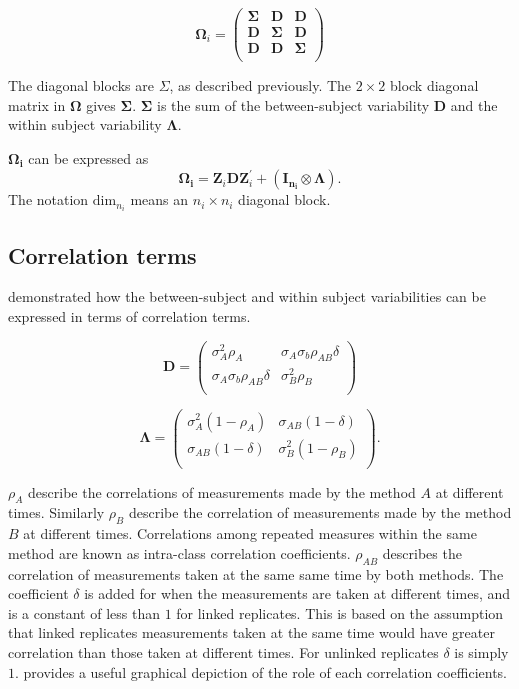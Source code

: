 \documentclass[12pt, a4paper]{report}
\theoremstyle{plain}
\theoremstyle{definition}
\theoremstyle{remark}
\begin{document}
	\[
	\boldsymbol{\Omega}_{i} = \left(
	\begin{array}{ccc}
	\boldsymbol{\Sigma} & \boldsymbol{D} & \boldsymbol{D}\\
	\boldsymbol{D} & \boldsymbol{\Sigma} & \boldsymbol{D}\\
	\boldsymbol{D} & \boldsymbol{D} & \boldsymbol{\Sigma}\\
	\end{array}\right)
	\]
	
	The diagonal blocks are $\Sigma$, as described previously. The $2 \times 2$ block diagonal matrix in $\boldsymbol{\Omega}$ gives $\boldsymbol{\Sigma}$. $\boldsymbol{\Sigma}$ is the sum of the between-subject variability $\boldsymbol{D}$ and the within subject variability $\boldsymbol{\Lambda}$.
	
	$\boldsymbol{\Omega_{i}}$ can be expressed as
	\[
	\boldsymbol{\Omega_{i}} = \boldsymbol{Z}_{i}\boldsymbol{D}\boldsymbol{Z}_{i}^\prime + ({\boldsymbol{I_{n_{i}}} \otimes \boldsymbol{\Lambda}}).
	\]
	The notation $\mbox{dim}_{n_{i}}$ means an $n_{i} \times n_{i}$ diagonal block.
	
	\subsection{Correlation terms}
	\citet{hamlett} demonstrated how the between-subject and within subject variabilities can be expressed in terms of
	correlation terms.
	
	\[
	\boldsymbol{D} = \left( \begin{array}{cc}
	\sigma^2_{A}\rho_{A} & \sigma_{A}\sigma_{b}\rho_{AB}\delta \\
	\sigma_{A}\sigma_{b}\rho_{AB}\delta & \sigma^2_{B}\rho_{B}\\
	
	\end{array}\right)
	\]
	
	\[
	\boldsymbol{\Lambda} = \left(
	\begin{array}{cc}
	\sigma^2_{A}(1-\rho_{A}) & \sigma_{AB}(1-\delta)  \\
	\sigma_{AB}(1-\delta) & \sigma^2_{B}(1-\rho_{B}) \\
	\end{array}\right).
	\]
	
	$\rho_{A}$ describe the correlations of measurements made by the method $A$ at different times. Similarly $\rho_{B}$ describe the correlation of measurements made by the method $B$ at different times. Correlations among repeated measures within the same method are known as intra-class correlation coefficients. $\rho_{AB}$ describes the correlation of measurements taken at the same same time by both methods. The coefficient $\delta$ is added for when the measurements are taken at different times, and is a constant of less than $1$ for linked replicates. This is based on the assumption that linked replicates measurements taken at the same time would have greater correlation than those taken at different times. For unlinked replicates $\delta$ is simply $1$. \citet{hamlett} provides a useful graphical depiction of the role of each correlation coefficients.
	
\end{document}
